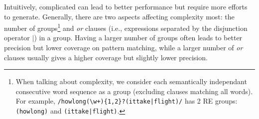 

Intuitively, complicated \REs can lead to better performance but require more efforts to generate. %
 Generally, there are two aspects affecting \RE complexity most: the number of \RE groups\footnote{
	When talking about complexity, we consider each semantically independant consecutive word sequence as a \RE group (excluding clauses matching all words).
	For example, {\small \texttt{/how\:long(\:\textbackslash w+)\{1,2\}?\:(it\:take|flight)/}} has 2 RE groups: {\small \texttt{(how\;long)}} and {\small \texttt{(it\;take|flight)}}.
}
and \emph{or} clauses (i.e., expressions separated by the disjunction operator $|$) in a \RE group. Having a larger number of \RE groups
often leads to better precision but lower coverage on pattern matching, while a larger number of \emph{or} clauses usually gives a higher
coverage but slightly lower precision.



